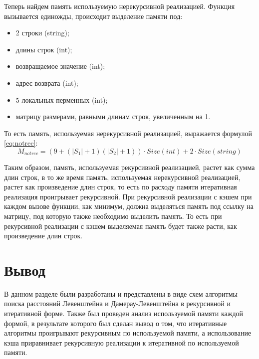 Теперь найдем память используемую нерекурсивной реализацией. Функция вызывается
единожды, происходит выделение памяти под:
\begin{itemize}
    \item 2 строки (string);
    \item длины строк (int);
    \item возвращаемое значение (int);
    \item адрес возврата (int);
    \item 5 локальных перменных (int);
    \item матрицу размерами, равными длинам строк, увеличенным на 1.
\end{itemize}

То есть память, используемая нерекурсивной реализацией, выражается формулой
\ref{eq:notrec}:
\begin{equation}\label{eq:notrec}
    M_{notrec} = (9 + (|S_1| + 1)(|S_2| + 1)) \cdot Size(int)
                 + 2 \cdot Size(string)
\end{equation}

Таким образом, память, используемая рекурсивной реализацией, растет как сумма
длин строк, в то же время память, используемая нерекурсивной реализацией,
растет как произведение длин строк, то есть по расходу памяти итеративная
реализация проигрывает рекурсивной. При рекурсивной реализации с кэшем при
каждом вызове функции, как минимум, должна выделяться память под ссылку на
матрицу, под которую также необходимо выделить память. То есть при рекурсивной
реализации с кэшем выделяемая память будет также расти, как произведение длин
строк.

\section{Вывод}

В данном разделе были разработаны и представлены в виде схем алгоритмы поиска
расстояний Левенштейна и Дамерау-Левенштейна в рекурсивной и итеративной форме.
Также был проведен анализ используемой памяти каждой формой, в результате
которого был сделан вывод о том, что итеративные алгоритмы проигрывают
рекурсивным по используемой памяти, а использование кэша приравнивает
рекурсивную реализации к итеративной по используемой памяти.
